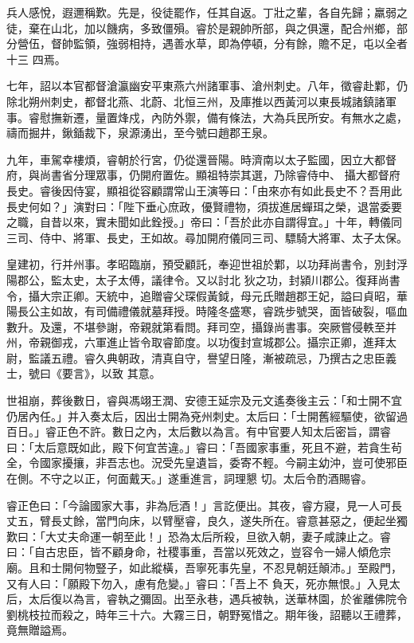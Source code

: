 \begin{pinyinscope}
 兵人感悅，遐邇稱歎。先是，役徒罷作，任其自返。丁壯之輩，各自先歸；羸弱之徒，棄在山北，加以饑病，多致僵殞。睿於是親帥所部，與之俱還，配合州鄉，部分營伍，督帥監領，強弱相持，遇善水草，即為停頓，分有餘，贍不足，屯以全者十三
 四焉。



 七年，詔以本官都督滄瀛幽安平東燕六州諸軍事、滄州刺史。八年，徵睿赴鄴，仍除北朔州刺史，都督北燕、北蔚、北恒三州，及庫推以西黃河以東長城諸鎮諸軍事。睿慰撫新遷，量置烽戍，內防外禦，備有條法，大為兵民所安。有無水之處，禱而掘井，鍬鍤裁下，泉源湧出，至今號曰趙郡王泉。



 九年，車駕幸樓煩，睿朝於行宮，仍從還晉陽。時濟南以太子監國，因立大都督府，與尚書省分理眾事，仍開府置佐。顯祖特崇其選，乃除睿侍中、
 攝大都督府長史。睿後因侍宴，顯祖從容顧謂常山王演等曰：「由來亦有如此長史不？吾用此長史何如？」演對曰：「陛下垂心庶政，優賢禮物，須拔進居蟬珥之榮，退當委要之職，自昔以來，實未聞如此銓授。」帝曰：「吾於此亦自謂得宜。」十年，轉儀同三司、侍中、將軍、長史，王如故。尋加開府儀同三司、驃騎大將軍、太子太保。



 皇建初，行并州事。孝昭臨崩，預受顧託，奉迎世祖於鄴，以功拜尚書令，別封浮陽郡公，監太史，太子太傅，議律令。又以討北
 狄之功，封潁川郡公。復拜尚書令，攝大宗正卿。天統中，追贈睿父琛假黃鉞，母元氏贈趙郡王妃，謚曰貞昭，華陽長公主如故，有司備禮儀就墓拜授。時隆冬盛寒，睿跣步號哭，面皆破裂，嘔血數升。及還，不堪參謝，帝親就第看問。拜司空，攝錄尚書事。突厥嘗侵軼至并州，帝親御戎，六軍進止皆令取睿節度。以功復封宣城郡公。攝宗正卿，進拜太尉，監議五禮。睿久典朝政，清真自守，譽望日隆，漸被疏忌，乃撰古之忠臣義士，號曰《要言》，以致
 其意。



 世祖崩，葬後數日，睿與馮翊王潤、安德王延宗及元文遙奏後主云：「和士開不宜仍居內任。」并入奏太后，因出士開為兗州刺史。太后曰：「士開舊經驅使，欲留過百日。」睿正色不許。數日之內，太后數以為言。有中官要人知太后密旨，謂睿曰：「太后意既如此，殿下何宜苦違。」睿曰：「吾國家事重，死且不避，若貪生茍全，令國家擾攘，非吾志也。況受先皇遺旨，委寄不輕。今嗣主幼沖，豈可使邪臣在側。不守之以正，何面戴天。」遂重進言，詞理懇
 切。太后令酌酒賜睿。



 睿正色曰：「今論國家大事，非為卮酒！」言訖便出。其夜，睿方寢，見一人可長丈五，臂長丈餘，當門向床，以臂壓睿，良久，遂失所在。睿意甚惡之，便起坐獨歎曰：「大丈夫命運一朝至此！」恐為太后所殺，旦欲入朝，妻子咸諫止之。睿曰：「自古忠臣，皆不顧身命，社稷事重，吾當以死效之，豈容令一婦人傾危宗廟。且和士開何物豎子，如此縱橫，吾寧死事先皇，不忍見朝廷顛沛。」至殿門，又有人曰：「願殿下勿入，慮有危變。」睿曰：「吾上不
 負天，死亦無恨。」入見太后，太后復以為言，睿執之彌固。出至永巷，遇兵被執，送華林園，於雀離佛院令劉桃枝拉而殺之，時年三十六。大霧三日，朝野冤惜之。期年後，詔聽以王禮葬，竟無贈謚焉。




\end{pinyinscope}
